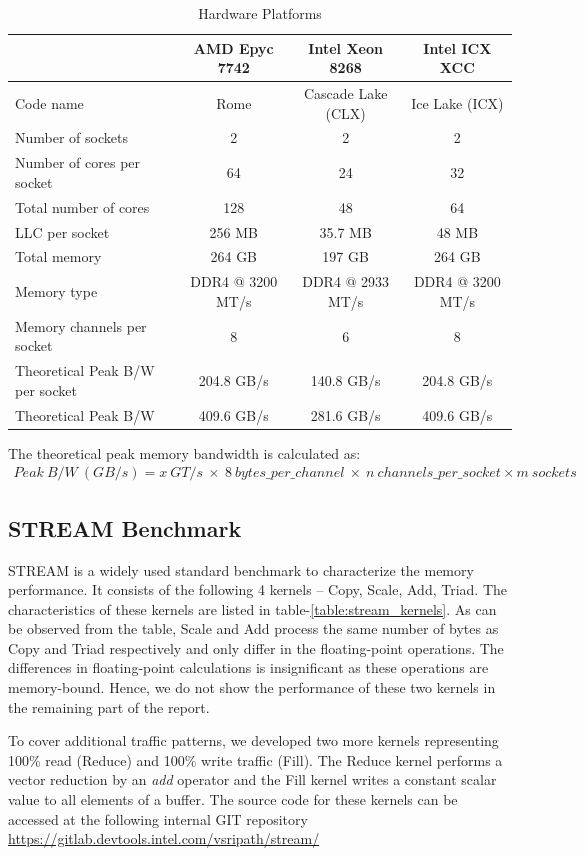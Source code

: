 \documentclass{article}
\begin{document}
\begin{table}[h!]
\centering
 \begin{tabular}{|l|c|c|c|} \hline
& AMD Epyc 7742 & Intel Xeon 8268 & Intel ICX XCC \\\hline
Code name & Rome & Cascade Lake (CLX) & Ice Lake (ICX) \\ \hline
Number of sockets & 2 & 2 & 2 \\ \hline
Number of cores per socket & 64 & 24 & 32 \\ \hline
Total number of cores & 128 & 48 & 64 \\ \hline
LLC per socket & 256 MB & 35.7 MB & 48 MB \\ \hline
Total memory & 264 GB & 197 GB & 264 GB \\ \hline
Memory type & DDR4 @ 3200 MT/s & DDR4 @ 2933 MT/s & DDR4 @ 3200 MT/s \\ \hline
Memory channels per socket & 8 & 6 & 8 \\ \hline
Theoretical Peak B/W per socket & 204.8 GB/s & 140.8 GB/s & 204.8 GB/s\\   \hline
Theoretical Peak B/W & 409.6 GB/s & 281.6 GB/s & 409.6 GB/s\\   \hline
\end{tabular}
\caption{Hardware Platforms}
\label{table:hw_platforms}
\end{table}

The theoretical peak memory bandwidth is calculated as: 
\begin{align*}
 Peak\: B/W\: (GB/s) = x\: GT/s\: \times\: 8 \:bytes\_per\_channel\: \times\:  n\: channels\_per\_socket \times m\: sockets
\end{align*}

\subsection{STREAM Benchmark}
STREAM is a widely used standard benchmark to characterize the memory performance. It consists of the following 4 kernels -- Copy, Scale, Add, Triad. The characteristics of these kernels are listed in table-\ref{table:stream_kernels}. As can be observed from the table, Scale and Add process the same number of bytes as Copy and Triad respectively and only differ in the floating-point operations. The differences in floating-point calculations is insignificant as these operations are memory-bound. Hence, we do not show the performance of these two kernels in the remaining part of the report.

To cover additional traffic patterns, we developed two more kernels representing 100\% read (Reduce) and 100\% write traffic (Fill). The Reduce kernel performs a vector reduction by an \textit{add} operator and the Fill kernel writes a constant scalar value to all elements of a buffer. The source code for these kernels can be accessed at the following internal GIT repository \url{https://gitlab.devtools.intel.com/vsripath/stream/}
\end{document}
